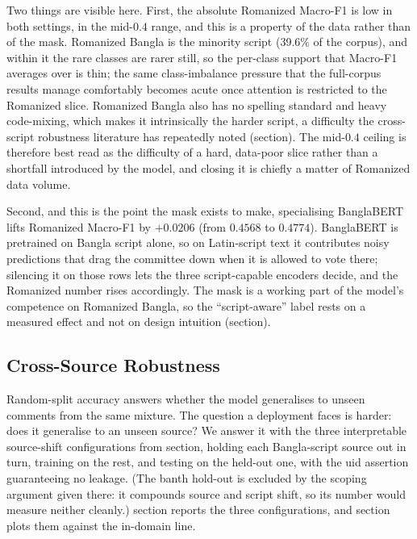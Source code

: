 \documentclass[11pt,a4paper]{article}
\def\dset#1{#1}%
\def\cref#1{section}%
\def\texttt#1{#1}%
\def\textsc#1{#1}%
\def\emph#1{#1}%
\providecommand{\dset}[1]{\textsc{#1}}
\begin{document}
Two things are visible here. First, the absolute Romanized Macro-F1 is low in both settings, in the mid-$0.4$ range, and this is a property of the data rather than of the mask. Romanized Bangla is the minority script (39.6\% of the corpus), and within it the rare classes are rarer still, so the per-class support that Macro-F1 averages over is thin; the same class-imbalance pressure that the full-corpus results manage comfortably becomes acute once attention is restricted to the Romanized slice. Romanized Bangla also has no spelling standard and heavy code-mixing, which makes it intrinsically the harder script, a difficulty the cross-script robustness literature has repeatedly noted (\cref{sec:rw-script}). The mid-$0.4$ ceiling is therefore best read as the difficulty of a hard, data-poor slice rather than a shortfall introduced by the model, and closing it is chiefly a matter of Romanized data volume.

Second, and this is the point the mask exists to make, specialising BanglaBERT lifts Romanized Macro-F1 by $+0.0206$ (from $0.4568$ to $0.4774$). BanglaBERT is pretrained on Bangla script alone, so on Latin-script text it contributes noisy predictions that drag the committee down when it is allowed to vote there; silencing it on those rows lets the three script-capable encoders decide, and the Romanized number rises accordingly. The mask is a working part of the model's competence on Romanized Bangla, so the ``script-aware'' label rests on a measured effect and not on design intuition (\cref{sec:limitations}).

\subsection{Cross-Source Robustness}
\label{sec:robustness-results}

Random-split accuracy answers whether the model generalises to unseen comments from the same mixture. The question a deployment faces is harder: does it generalise to an unseen \emph{source}? We answer it with the three interpretable source-shift configurations from \cref{sec:splits}, holding each Bangla-script source out in turn, training on the rest, and testing on the held-out one, with the \texttt{uid} assertion guaranteeing no leakage. (The \dset{banth} hold-out is excluded by the scoping argument given there: it compounds source and script shift, so its number would measure neither cleanly.) \cref{tab:robustness} reports the three configurations, and \cref{fig:robustness} plots them against the in-domain line.
\end{document}
